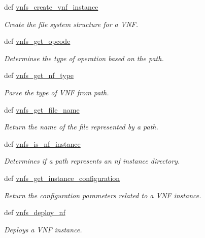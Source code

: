 \begin{DoxyCompactItemize}
\item 
def \hyperlink{classvnfs__operations_1_1VNFSOperations_ae73c421b301cbda862896f9fe67a7941}{vnfs\-\_\-create\-\_\-vnf\-\_\-instance}
\begin{DoxyCompactList}\small\item\em Create the file system structure for a V\-N\-F. \end{DoxyCompactList}\item 
def \hyperlink{classvnfs__operations_1_1VNFSOperations_a3c0b706c40d09a2ed679aed33d37b5e9}{vnfs\-\_\-get\-\_\-opcode}
\begin{DoxyCompactList}\small\item\em Determinse the type of operation based on the path. \end{DoxyCompactList}\item 
def \hyperlink{classvnfs__operations_1_1VNFSOperations_a75430767bdb54f256059c588058b3323}{vnfs\-\_\-get\-\_\-nf\-\_\-type}
\begin{DoxyCompactList}\small\item\em Parse the type of V\-N\-F from path. \end{DoxyCompactList}\item 
def \hyperlink{classvnfs__operations_1_1VNFSOperations_a9461289b4af0fef0db381e5ec17a6cac}{vnfs\-\_\-get\-\_\-file\-\_\-name}
\begin{DoxyCompactList}\small\item\em Return the name of the file represented by a path. \end{DoxyCompactList}\item 
def \hyperlink{classvnfs__operations_1_1VNFSOperations_a464c0ebd7c574c62d76d352a3a59aec0}{vnfs\-\_\-is\-\_\-nf\-\_\-instance}
\begin{DoxyCompactList}\small\item\em Determines if a path represents an nf instance directory. \end{DoxyCompactList}\item 
def \hyperlink{classvnfs__operations_1_1VNFSOperations_a367f1d6fb6749b0a16af47381d43c874}{vnfs\-\_\-get\-\_\-instance\-\_\-configuration}
\begin{DoxyCompactList}\small\item\em Return the configuration parameters related to a V\-N\-F instance. \end{DoxyCompactList}\item 
def \hyperlink{classvnfs__operations_1_1VNFSOperations_a304bb0780682b050cdf9d43e3f279ead}{vnfs\-\_\-deploy\-\_\-nf}
\begin{DoxyCompactList}\small\item\em Deploys a V\-N\-F instance. \end{DoxyCompactList}\item 

\end{DoxyCompactItemize}
